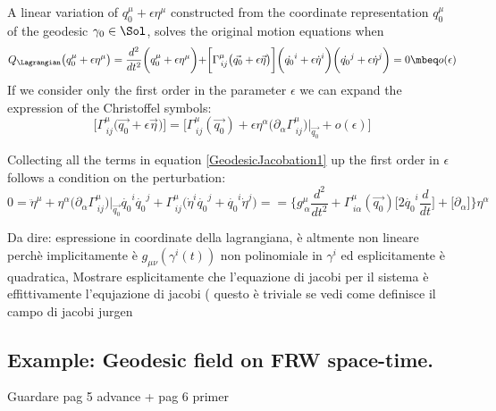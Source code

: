 \documentclass[Main]{subfiles}
\begin{document}
	A linear variation of $q_0^\mu +\epsilon \eta^\mu$ constructed from the coordinate representation $q_0^\mu$ of the geodesic $\gamma_0 \in \Sol$, solves the original motion equations when
	\begin{equation}\label{GeodesicJacobation1}
		Q_\Lagrangian \big( q_0^\mu +\epsilon \eta^\mu \big) = \frac{d^2}{dt^2}\biggr( q_0^\mu +\epsilon \eta^\mu \biggr) +
		\biggr[ \Gamma^\mu_{\, i j}\big( \vec{q_0} + \epsilon \vec{\eta}\big) \biggr]\biggr(\dot{q_0}^i +\epsilon \dot{\eta}^i \biggr)\biggr(\dot{q_0}^j +\epsilon \dot{\eta}^j \biggr) = 0 \mbeq o(\epsilon)
	\end{equation}
	If we consider only the first order in the parameter $\epsilon$ we can expand the expression of the Christoffel symbols:
	\begin{displaymath}
		\biggr[ \Gamma^\mu_{\, i j}\big( \vec{q_0} + \epsilon \vec{\eta}\big) \biggr] =
		\biggr[ \Gamma^\mu_{\, i j}( \vec{q_0}) + \epsilon \eta^\alpha\big( \partial_\alpha  \Gamma^\mu_{\, i j} \big)\biggr\vert_{\vec{q_0}} + o(\epsilon) \biggr]
	\end{displaymath}	 
	
	Collecting all the terms in equation \ref{GeodesicJacobation1} up the first order in $\epsilon$ follows a condition on the perturbation:
	\begin{displaymath}
	0 = \ddot{\eta}^\mu + \eta^\alpha\big( \partial_\alpha  \Gamma^\mu_{\, i j} \big)\biggr\vert_{\vec{q_0}} \dot{q_0}^i \dot{q_0}^j  +  \Gamma^\mu_{\, i j} \big(\dot{\eta}^i \dot{q_0}^j + \dot{q_0}^i \dot{\eta}^j \big)=
	=\biggr\{ g^\mu_{\,\alpha} \frac{d^2}{dt^2} +
	 \Gamma^\mu_{\, i \alpha}(\vec{q_0})\big[2 \dot{q_0}^i \frac{d}{dt} \big] + 
\big[ \partial_\alpha  \big] \biggr\} \eta^\alpha	 
	\end{displaymath}		
	
	
	\begin{Warning}
	Da dire: espressione in coordinate della lagrangiana, è altmente non lineare perchè implicitamente è $g_{\mu\nu}(\gamma^i(t))$ non polinomiale in $\gamma^i$ ed esplicitamente è quadratica, Mostrare esplicitamente che l'equazione di jacobi per il sistema è effittivamente l'equjazione di jacobi ( questo è triviale se vedi come definisce il campo di jacobi jurgen 
	\end{Warning}	


	
	

\subsection{Example: Geodesic field on FRW space-time.}
	Guardare pag 5 advance + pag 6 primer	
	
\end{document}
